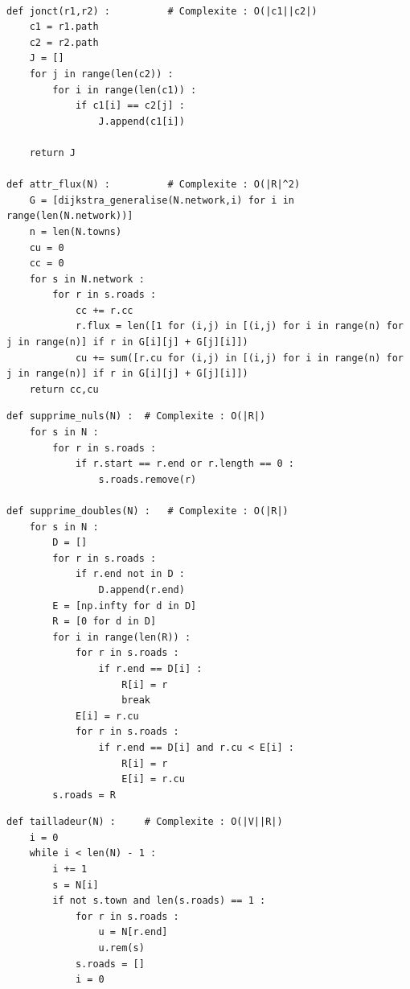 \documentclass{beamer}[11pt]
\begin{document}
		\begin{frame}[containsverbatim]
\begin{lstlisting}

def jonct(r1,r2) :			# Complexite : O(|c1||c2|)
    c1 = r1.path
    c2 = r2.path
    J = []
    for j in range(len(c2)) :
        for i in range(len(c1)) :
            if c1[i] == c2[j] :
                J.append(c1[i])

    return J

def attr_flux(N) :			# Complexite : O(|R|^2)
    G = [dijkstra_generalise(N.network,i) for i in range(len(N.network))]
    n = len(N.towns)
    cu = 0
    cc = 0
    for s in N.network :
        for r in s.roads :
            cc += r.cc
            r.flux = len([1 for (i,j) in [(i,j) for i in range(n) for j in range(n)] if r in G[i][j] + G[j][i]])
            cu += sum([r.cu for (i,j) in [(i,j) for i in range(n) for j in range(n)] if r in G[i][j] + G[j][i]])
    return cc,cu
\end{lstlisting}
		\end{frame}

		\begin{frame}[containsverbatim]
\begin{lstlisting}
def supprime_nuls(N) :	# Complexite : O(|R|)
    for s in N :
        for r in s.roads :
            if r.start == r.end or r.length == 0 :
                s.roads.remove(r)

def supprime_doubles(N) :	# Complexite : O(|R|)
    for s in N :
        D = []
        for r in s.roads :
            if r.end not in D :
                D.append(r.end)
        E = [np.infty for d in D]
        R = [0 for d in D]
        for i in range(len(R)) :
            for r in s.roads :
                if r.end == D[i] :
                    R[i] = r
                    break
            E[i] = r.cu
            for r in s.roads :
                if r.end == D[i] and r.cu < E[i] :
                    R[i] = r
                    E[i] = r.cu
        s.roads = R
\end{lstlisting}
		\end{frame}

		\begin{frame}[containsverbatim]
\begin{lstlisting}
def tailladeur(N) :		# Complexite : O(|V||R|)
    i = 0
    while i < len(N) - 1 :
        i += 1
        s = N[i]
        if not s.town and len(s.roads) == 1 :
            for r in s.roads :
                u = N[r.end]
                u.rem(s)
            s.roads = []
            i = 0
\end{lstlisting}
		\end{frame}
\end{document}
